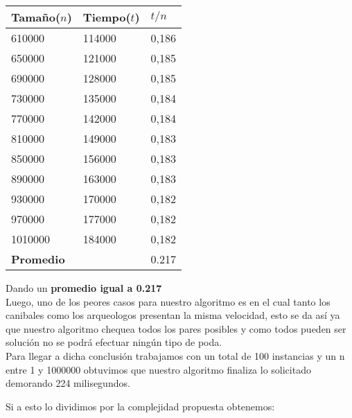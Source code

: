 \begin{table}[H]

    \begin{tabular}{ | l | l |l |}
    \hline
		Tamaño($n$) & Tiempo($t$) & \textbf{$t /n$}  \\ \hline
610000 & 114000 & 0,186 \\ \hline
650000 & 121000 & 0,185 \\ \hline
690000 & 128000 & 0,185 \\ \hline
730000 & 135000 & 0,184 \\ \hline
770000 & 142000 & 0,184 \\ \hline
810000 & 149000 & 0,183 \\ \hline
850000 & 156000 & 0,183 \\ \hline
890000 & 163000 & 0,183 \\ \hline
930000 & 170000 & 0,182 \\ \hline
970000 & 177000 & 0,182 \\ \hline
1010000 & 184000 & 0,182 \\ \hline

\textbf{Promedio} & & 0.217 \\ \hline

    \end{tabular}
\end{table}

Dando un \textbf{promedio igual a 0.217 }\\

Luego, uno de los peores casos para nuestro algoritmo es en el cual tanto los canibales como los arqueologos presentan la misma velocidad, esto se da as\'i ya que nuestro algoritmo chequea todos los pares posibles y como todos pueden ser soluci\'on no se podr\'a efectuar ning\'un tipo de poda.\\

Para llegar a dicha conclusi\'on trabajamos con un total de 100 instancias y un n entre 1 y 1000000 obtuvimos que nuestro
algoritmo finaliza lo solicitado demorando 224 milisegundos.\\

\vspace*{0.3cm} \vspace*{0.3cm}
  \begin{center}
  \end{center}
  \vspace*{0.3cm}

Si a esto lo dividimos por la complejidad propuesta obtenemos:\\

